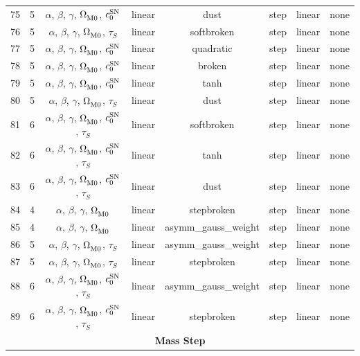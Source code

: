 \begin{longtable}{c c c c c c c c}
    75 & 5 & $\alpha$, $\beta$, $\gamma$, $\Omega_{\rm M0}^{}$, $c_0^{\rm SN}$ & linear & dust & step & linear & none \\
    76 & 5 & $\alpha$, $\beta$, $\gamma$, $\Omega_{\rm M0}^{}$, $\tau_S^{}$ & linear & softbroken & step & linear & none \\
    77 & 5 & $\alpha$, $\beta$, $\gamma$, $\Omega_{\rm M0}^{}$, $c_0^{\rm SN}$ & linear & quadratic & step & linear & none \\
    78 & 5 & $\alpha$, $\beta$, $\gamma$, $\Omega_{\rm M0}^{}$, $c_0^{\rm SN}$ & linear & broken & step & linear & none \\
    79 & 5 & $\alpha$, $\beta$, $\gamma$, $\Omega_{\rm M0}^{}$, $c_0^{\rm SN}$ & linear & tanh & step & linear & none \\
    80 & 5 & $\alpha$, $\beta$, $\gamma$, $\Omega_{\rm M0}^{}$, $\tau_S^{}$ & linear & dust & step & linear & none \\
    81 & 6 & $\alpha$, $\beta$, $\gamma$, $\Omega_{\rm M0}^{}$, $c_0^{\rm SN}$, $\tau_S^{}$ & linear & softbroken & step & linear & none \\
    82 & 6 & $\alpha$, $\beta$, $\gamma$, $\Omega_{\rm M0}^{}$, $c_0^{\rm SN}$, $\tau_S^{}$ & linear & tanh & step & linear & none \\
    83 & 6 & $\alpha$, $\beta$, $\gamma$, $\Omega_{\rm M0}^{}$, $c_0^{\rm SN}$, $\tau_S^{}$ & linear & dust & step & linear & none \\
    84 & 4 & $\alpha$, $\beta$, $\gamma$, $\Omega_{\rm M0}^{}$ & linear & stepbroken & step & linear & none \\
    85 & 4 & $\alpha$, $\beta$, $\gamma$, $\Omega_{\rm M0}^{}$ & linear & asymm\_gauss\_weight & step & linear & none \\
    86 & 5 & $\alpha$, $\beta$, $\gamma$, $\Omega_{\rm M0}^{}$, $\tau_S^{}$ & linear & asymm\_gauss\_weight & step & linear & none \\
    87 & 5 & $\alpha$, $\beta$, $\gamma$, $\Omega_{\rm M0}^{}$, $\tau_S^{}$ & linear & stepbroken & step & linear & none \\
    88 & 6 & $\alpha$, $\beta$, $\gamma$, $\Omega_{\rm M0}^{}$, $c_0^{\rm SN}$, $\tau_S^{}$ & linear & asymm\_gauss\_weight & step & linear & none \\
    89 & 6 & $\alpha$, $\beta$, $\gamma$, $\Omega_{\rm M0}^{}$, $c_0^{\rm SN}$, $\tau_S^{}$ & linear & stepbroken & step & linear & none \\
    \hline
    \multicolumn{8}{c}{\textbf{Mass Step}} \\

\end{longtable}
